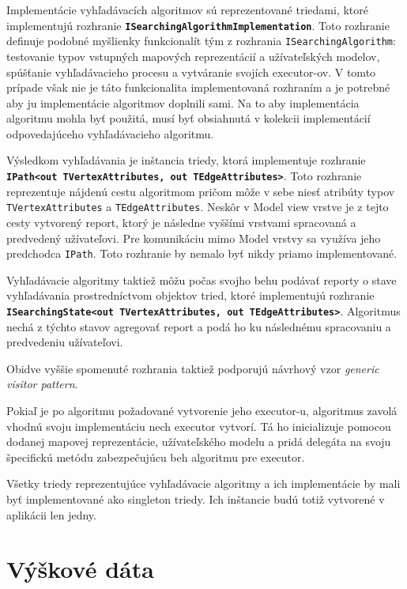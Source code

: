 Implementácie vyhľadávacích algoritmov sú reprezentované triedami, ktoré implementujú rozhranie \textbf{\texttt{ISearchingAlgorithmImplementation}}. Toto rozhranie definuje podobné myšlienky funkcionalít tým z rozhrania \texttt{ISearchingAlgorithm}: testovanie typov vstupných mapových reprezentácií a užívateľských modelov, spúšťanie vyhľadávacieho procesu a vytváranie svojích executor-ov. V tomto prípade však nie je táto funkcionalita implementovaná rozhraním a je potrebné aby ju implementácie algoritmov doplnili sami. Na to aby implementácia algoritmu mohla byť použitá, musí byť obsiahnutá v kolekcii implementácií odpovedajúceho vyhľadávacieho algoritmu. 

Výsledkom vyhľadávania je inštancia triedy, ktorá implementuje rozhranie \textbf{\texttt{IPath<out TVertexAttributes, out TEdgeAttributes>}}. Toto rozhranie reprezentuje nájdenú cestu algoritmom pričom môže v sebe niesť atribúty typov \texttt{TVertexAttributes} a \texttt{TEdgeAttributes}. Neskôr v Model view vrstve je z tejto cesty vytvorený report, ktorý je následne vyššími vrstvami spracovaná a predvedený užívateľovi. Pre komunikáciu mimo Model vrstvy sa využíva jeho predchodca \texttt{IPath}. Toto rozhranie by nemalo byť nikdy priamo implementované. 

Vyhľadávacie algoritmy taktiež môžu počas svojho behu podávať reporty o stave vyhľadávania prostredníctvom objektov tried, ktoré implementujú rozhranie \textbf{\texttt{ISearchingState<out TVertexAttributes, out TEdgeAttributes>}}. Algoritmus nechá z týchto stavov agregovať report a podá ho ku následnému spracovaniu a predvedeniu užívateľovi.

Obidve vyššie spomenuté rozhrania taktiež podporujú návrhový vzor \textit{generic visitor pattern}. 

Pokiaľ je po algoritmu požadované vytvorenie jeho executor-u, algoritmus zavolá vhodnú svoju implementáciu nech executor vytvorí. Tá ho inicializuje pomocou dodanej mapovej reprezentácie, užívateľského modelu a pridá delegáta na svoju špecifickú metódu zabezpečujúcu beh algoritmu pre executor.

Všetky triedy reprezentujúce vyhľadávacie algoritmy a ich implementácie by mali byť implementované ako singleton triedy. Ich inštancie budú totiž vytvorené v aplikácii len jedny.

\section{Výškové dáta}

